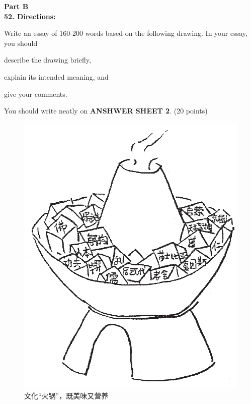\noindent
\textbf{Part B}\\
\textbf{52. Directions:}

Write an essay of 160-200 words based on the following drawing. In your
essay, you should
\begin{listwrite}
	\item
 describe the drawing briefly,

\item 
 explain its intended meaning, and 

\item 
 give your comments.
\end{listwrite}

You should write neatly on \textbf{ANSHWER SHEET 2}. (20 points)


\begin{figure}[h!]
	\centering
	\includegraphics[width=0.36\linewidth]{picture/2010.png}
	\caption*{文化“火锅”，既美味又营养}
\end{figure}

\checkpagenumber